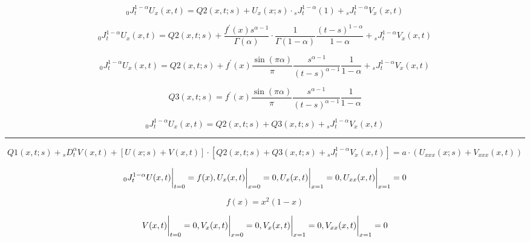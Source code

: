 \documentclass[12pt, a4paper]{article}
\begin{document}
	\begin{equation}
	{}_{0}J^{1-\alpha}_{t}U_{x}(x,t) =  Q2(x,t;s) + U_{x}(x;s)\cdot {}_{s}J^{1-\alpha}_{t}(1) +  {}_{s}J^{1-\alpha}_{t}V_{x}(x,t)
	\end{equation}

	\begin{equation}
	{}_{0}J^{1-\alpha}_{t}U_{x}(x,t) =  Q2(x,t;s) + \frac{f^{'}(x)s^{\alpha-1}}{\Gamma(\alpha)}\cdot \frac{1}{\Gamma(1-\alpha)} \frac{(t-s)^{1-\alpha}}{1-\alpha} +  {}_{s}J^{1-\alpha}_{t}V_{x}(x,t)
	\end{equation}
	
	\begin{equation}
	{}_{0}J^{1-\alpha}_{t}U_{x}(x,t) =  Q2(x,t;s) +  f^{'}(x) \frac{\sin(\pi \alpha)}{\pi} \frac{s^{\alpha - 1}}{(t-s)^{\alpha-1}} \frac{1}{1-\alpha} +  {}_{s}J^{1-\alpha}_{t}V_{x}(x,t)
	\end{equation}
	
	\begin{equation}
	Q3(x,t;s) = f^{'}(x) \frac{\sin(\pi \alpha)}{\pi} \frac{s^{\alpha - 1}}{(t-s)^{\alpha-1}} \frac{1}{1-\alpha}
	\end{equation}
	
	\begin{equation}
	{}_{0}J^{1-\alpha}_{t}U_{x}(x,t) =  Q2(x,t;s) +  Q3(x,t;s) +  {}_{s}J^{1-\alpha}_{t}V_{x}(x,t)
	\end{equation}
	
\noindent\rule{\linewidth}{0.4pt}
	\begin{dmath}
	Q1(x,t;s) + {}_{s}D_{t}^{\alpha} V(x,t) + [U(x;s) + V(x,t)]\cdot [ Q2(x,t;s) +  Q3(x,t;s) +  {}_{s}J^{1-\alpha}_{t}V_{x}(x,t)]=a \cdot (U_{xxx}(x;s) + V_{xxx}(x,t))
	\end{dmath}
	
	\begin{equation}
	{}_{0}J^{1-\alpha}_{t}U(x,t) \bigg{|}_{t=0} = f(x), U_{x}(x,t) \bigg{|}_{x=0}=0, U_{x}(x,t) \bigg{|}_{x=1}=0, U_{xx}(x,t) \bigg{|}_{x=1}=0
	\end{equation}
	
	\begin{equation}
	f(x) = x^{2}(1-x)
	\end{equation}
	
	\begin{equation}
	V(x,t) \bigg{|}_{t=0} = 0, V_{x}(x,t) \bigg{|}_{x=0}=0, V_{x}(x,t) \bigg{|}_{x=1}=0, V_{xx}(x,t) \bigg{|}_{x=1}=0
	\end{equation}
	
	
	
\end{document}
